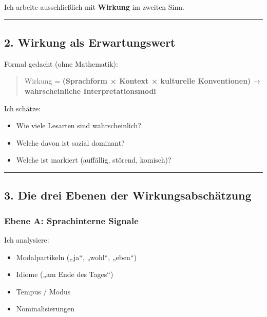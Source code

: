\documentclass[
  letterpaper,
  DIV=11,
  numbers=noendperiod]{scrartcl}
\providecommand{\tightlist}{%
  \setlength{\itemsep}{0pt}\setlength{\parskip}{0pt}}
\begin{document}
Ich arbeite ausschließlich mit \textbf{Wirkung} im zweiten Sinn.

\begin{center}\rule{0.5\linewidth}{0.5pt}\end{center}

\subsection{2. Wirkung als
Erwartungswert}\label{wirkung-als-erwartungswert}

Formal gedacht (ohne Mathematik):

\begin{quote}
Wirkung = \textbf{(Sprachform × Kontext × kulturelle Konventionen)} →
\textbf{wahrscheinliche Interpretationsmodi}
\end{quote}

Ich schätze:

\begin{itemize}
\tightlist
\item
  Wie viele Lesarten sind wahrscheinlich?
\item
  Welche davon ist sozial dominant?
\item
  Welche ist markiert (auffällig, störend, komisch)?
\end{itemize}

\begin{center}\rule{0.5\linewidth}{0.5pt}\end{center}

\subsection{3. Die drei Ebenen der
Wirkungsabschätzung}\label{die-drei-ebenen-der-wirkungsabschuxe4tzung}

\subsubsection{Ebene A: Sprachinterne
Signale}\label{ebene-a-sprachinterne-signale}

Ich analysiere:

\begin{itemize}
\tightlist
\item
  Modalpartikeln („ja``, „wohl``, „eben``)
\item
  Idiome („am Ende des Tages``)
\item
  Tempus / Modus
\item
  Nominalisierungen
\end{itemize}
\end{document}
